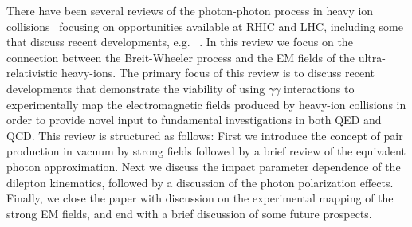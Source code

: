 \documentclass[12pt,epjc3]{svjour3}\sloppy
\begin{document}
There have been several reviews of the photon-photon process in heavy ion collisions~\cite{baurElectronPositronPairProduction2007a,baltzPhysicsUltraperipheralCollisions2008,brodskyHighEnergyPhotonphoton1995,baurCoherentPhotonphotonProcesses1993a} focusing on opportunities available at RHIC and LHC, including some that discuss recent developments, e.g. ~\cite{kleinPhotonuclearTwoPhotonInteractions2020}. 
In this review we focus on the connection between the Breit-Wheeler process and the EM fields of the ultra-relativistic heavy-ions. 
The primary focus of this review is to discuss recent developments that demonstrate the viability of using $\gamma\gamma$ interactions to experimentally map the electromagnetic fields produced by heavy-ion collisions in order to provide novel input to fundamental investigations in both QED and QCD. 
This review is structured as follows: First we introduce the concept of pair production in vacuum by strong fields followed by a brief review of the equivalent photon approximation. Next we discuss the impact parameter dependence of the dilepton kinematics, followed by a discussion of the photon polarization effects. Finally, we close the paper with discussion on the experimental mapping of the strong EM fields, and end with a brief discussion of some future prospects.
\end{document}
